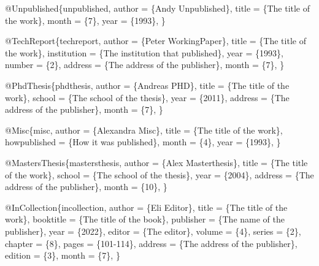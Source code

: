 \documentclass[
  stu,
  floatsintext,
  longtable,
  a4paper,
  nolmodern,
  notxfonts,
  notimes,
  colorlinks=true,linkcolor=black,citecolor=black,urlcolor=black]{apa7}
\newenvironment{Shaded}{\begin{snugshade}}{\end{snugshade}}
\newcommand{\NormalTok}[1]{\textcolor[rgb]{0.00,0.23,0.31}{#1}}
\begin{document}
\begin{Shaded}
\begin{Highlighting}[]
\NormalTok{    @Unpublished\{unpublished,}
\NormalTok{        author = \{Andy Unpublished\},}
\NormalTok{        title  = \{The title of the work\},}
\NormalTok{        month  = \{7\},}
\NormalTok{        year   = \{1993\},}
\NormalTok{    \}}
    
\NormalTok{    @TechReport\{techreport,}
\NormalTok{        author      = \{Peter WorkingPaper\},}
\NormalTok{        title       = \{The title of the work\},}
\NormalTok{        institution = \{The institution that published\},}
\NormalTok{        year        = \{1993\},}
\NormalTok{        number      = \{2\},}
\NormalTok{        address     = \{The address of the publisher\},}
\NormalTok{        month       = \{7\},}
\NormalTok{    \}}
    
\NormalTok{    @PhdThesis\{phdthesis,}
\NormalTok{        author  = \{Andreas PHD\},}
\NormalTok{        title   = \{The title of the work\},}
\NormalTok{        school  = \{The school of the thesis\},}
\NormalTok{        year    = \{2011\},}
\NormalTok{        address = \{The address of the publisher\},}
\NormalTok{        month   = \{7\},}
\NormalTok{    \}}
    
\NormalTok{    @Misc\{misc,}
\NormalTok{        author       = \{Alexandra Misc\},}
\NormalTok{        title        = \{The title of the work\},}
\NormalTok{        howpublished = \{How it was published\},}
\NormalTok{        month        = \{4\},}
\NormalTok{        year         = \{1993\},}
\NormalTok{    \}}
    
\NormalTok{    @MastersThesis\{mastersthesis,}
\NormalTok{        author  = \{Alex Masterthesis\},}
\NormalTok{        title   = \{The title of the work\},}
\NormalTok{        school  = \{The school of the thesis\},}
\NormalTok{        year    = \{2004\},}
\NormalTok{        address = \{The address of the publisher\},}
\NormalTok{        month   = \{10\},}
\NormalTok{    \}}
    
\NormalTok{    @InCollection\{incollection,}
\NormalTok{        author    = \{Eli Editor\},}
\NormalTok{        title     = \{The title of the work\},}
\NormalTok{        booktitle = \{The title of the book\},}
\NormalTok{        publisher = \{The name of the publisher\},}
\NormalTok{        year      = \{2022\},}
\NormalTok{        editor    = \{The editor\},}
\NormalTok{        volume    = \{4\},}
\NormalTok{        series    = \{2\},}
\NormalTok{        chapter   = \{8\},}
\NormalTok{        pages     = \{101{-}114\},}
\NormalTok{        address   = \{The address of the publisher\},}
\NormalTok{        edition   = \{3\},}
\NormalTok{        month     = \{7\},}
\NormalTok{    \}}
    

\end{Highlighting}
\end{Shaded}
\end{document}
